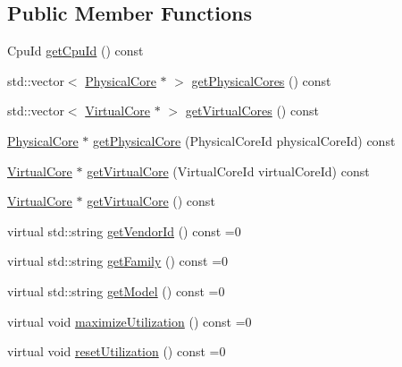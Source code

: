 \subsection*{Public Member Functions}
\begin{DoxyCompactItemize}
\item 
Cpu\-Id \hyperlink{classmammut_1_1topology_1_1Cpu_ab8f01a27491ad5bc899e99374279ae12}{get\-Cpu\-Id} () const 
\item 
std\-::vector$<$ \hyperlink{classmammut_1_1topology_1_1PhysicalCore}{Physical\-Core} $\ast$ $>$ \hyperlink{classmammut_1_1topology_1_1Cpu_a1edbe9813dab7ea1c2eed9276c4ef9e9}{get\-Physical\-Cores} () const 
\item 
std\-::vector$<$ \hyperlink{classmammut_1_1topology_1_1VirtualCore}{Virtual\-Core} $\ast$ $>$ \hyperlink{classmammut_1_1topology_1_1Cpu_a06cb0216f32933242733a4768f7a9e32}{get\-Virtual\-Cores} () const 
\item 
\hyperlink{classmammut_1_1topology_1_1PhysicalCore}{Physical\-Core} $\ast$ \hyperlink{classmammut_1_1topology_1_1Cpu_aa773de6864b1b00609abc4f3167529cf}{get\-Physical\-Core} (Physical\-Core\-Id physical\-Core\-Id) const 
\item 
\hyperlink{classmammut_1_1topology_1_1VirtualCore}{Virtual\-Core} $\ast$ \hyperlink{classmammut_1_1topology_1_1Cpu_a577fbb46e774bd0d84100cf4d9909350}{get\-Virtual\-Core} (Virtual\-Core\-Id virtual\-Core\-Id) const 
\item 
\hyperlink{classmammut_1_1topology_1_1VirtualCore}{Virtual\-Core} $\ast$ \hyperlink{classmammut_1_1topology_1_1Cpu_ab814276f1e71a5036f1673751d132c8b}{get\-Virtual\-Core} () const 
\item 
virtual std\-::string \hyperlink{classmammut_1_1topology_1_1Cpu_a7b1fcfcc8df09588832ca1dc6351e6f1}{get\-Vendor\-Id} () const =0
\item 
virtual std\-::string \hyperlink{classmammut_1_1topology_1_1Cpu_a14f0984b504c0c207250829728193f8c}{get\-Family} () const =0
\item 
virtual std\-::string \hyperlink{classmammut_1_1topology_1_1Cpu_a6e98555afbc9d4985acc4ec30fbc5d96}{get\-Model} () const =0
\item 
virtual void \hyperlink{classmammut_1_1topology_1_1Cpu_a249829ade28b8fffcda1d2666cf68997}{maximize\-Utilization} () const =0
\item 
virtual void \hyperlink{classmammut_1_1topology_1_1Cpu_a3eea41d7ad6200d83301102f23944de5}{reset\-Utilization} () const =0
\end{DoxyCompactItemize}
